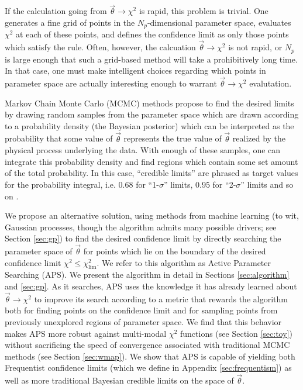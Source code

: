\documentclass[useAMS,usenatbib]{aastex}
\begin{document}
If the calculation going from $\vec{\theta}\rightarrow\chi^2$ is rapid, this
problem is trivial.  One generates a fine grid of points in the 
$N_p$-dimensional parameter space, evaluates $\chi^2$ at each of these points, 
and defines the confidence limit as only those points which satisfy the rule.  
Often, however, the calcuation $\vec{\theta}\rightarrow\chi^2$ is not rapid, or $N_p$
is large enough that such a grid-based method will take a prohibitively long
time.  In that case, one must make intelligent choices regarding which points in
parameter space are actually interesting enough to warrant
 $\vec{\theta}\rightarrow\chi^2$ evalutation.

Markov Chain Monte Carlo (MCMC) methods propose to find the desired
limits by drawing random samples from the parameter space which are drawn
according to a probability density (the Bayesian posterior) which can be
interpreted as the probability that some value of $\vec{\theta}$ represents the
true value of $\vec{\theta}$ realized by the physical process underlying
the data.  
With enough of these samples, one can integrate this
probability density and find regions which contain some set amount of the total
probability.  In this case, ``credible limits'' are phrased as target values
for the probability integral, i.e. 
$0.68$ for ``1-$\sigma$'' limits, $0.95$ for ``2-$\sigma$'' limits
and so on \cite{mcmc}.

We propose an alternative solution, using methods from machine learning
(to wit, Gaussian processes, though the algorithm admits many possible drivers; see
Section \ref{sec:gp})
to find the desired confidence limit by directly searching the
parameter space of $\vec{\theta}$ for points which lie on the boundary of the
desired confidence limit $\chi^2\le\chi^2_\text{lim}$.  
We refer to this algorithm as Active Parameter Searching (APS).
We present the algorithm in detail in Sections \ref{sec:algorithm} and
\ref{sec:gp}.
As it searches, APS uses
the knowledge it has already learned about $\vec{\theta}\rightarrow\chi^2$ 
to improve its search according to a metric that rewards the
algorithm both for finding points on the confidence limit and for sampling
points from previously unexplored regions of parameter space.  We find that this
behavior makes APS more robust against multi-modal $\chi^2$ functions (see
Section \ref{sec:toy}) without
sacrificing the speed of convergence 
associated with traditional MCMC methods (see Section \ref{sec:wmap}).
We show that APS is capable of yielding both Frequentist confidence
limits (which we define in Appendix \ref{sec:frequentism}) as well as more traditional
Bayesian credible limits on the space of $\vec{\theta}$.
\end{document}
